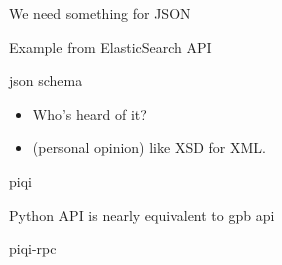 \documentclass[14pt]{beamer}
\newcommand{\listing}[1]{
    {\tiny }
}
\begin{document}
\begin{frame}{We need something for JSON}
    \listing{example.json}
    {\small Example from ElasticSearch API}
\end{frame}

\begin{frame}{json schema}
    \begin{itemize}
        \item Who's heard of it?
        \item (personal opinion) like XSD for XML.
    \end{itemize}
\end{frame}

\begin{frame}{piqi}
    \listing{demo/person.piqi}
\end{frame}

\begin{frame}{Python API is nearly equivalent to gpb api}
    \listing{pysession.txt}
\end{frame}

\begin{frame}{piqi-rpc}
\end{frame}
\end{document}
